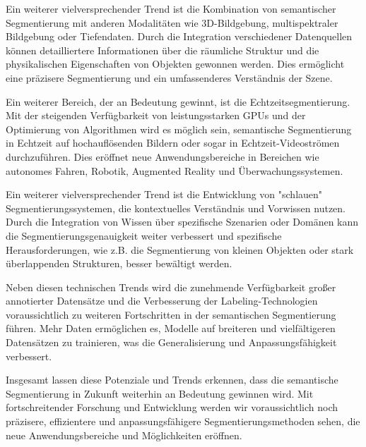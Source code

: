 Ein weiterer vielversprechender Trend ist die Kombination von semantischer
Segmentierung mit anderen Modalitäten wie 3D-Bildgebung, multispektraler
Bildgebung oder Tiefendaten. Durch die Integration verschiedener Datenquellen
können detailliertere Informationen über die räumliche Struktur und die
physikalischen Eigenschaften von Objekten gewonnen werden. Dies ermöglicht eine
präzisere Segmentierung und ein umfassenderes Verständnis der Szene.

Ein weiterer Bereich, der an Bedeutung gewinnt, ist die Echtzeitsegmentierung.
Mit der steigenden Verfügbarkeit von leistungsstarken GPUs und der Optimierung
von Algorithmen wird es möglich sein, semantische Segmentierung in Echtzeit auf
hochauflösenden Bildern oder sogar in Echtzeit-Videoströmen durchzuführen. Dies
eröffnet neue Anwendungsbereiche in Bereichen wie autonomes Fahren, Robotik,
Augmented Reality und Überwachungssystemen.

 Ein weiterer vielversprechender Trend ist die Entwicklung von "schlauen"
Segmentierungssystemen, die kontextuelles Verständnis und Vorwissen nutzen.
Durch die Integration von Wissen über spezifische Szenarien oder Domänen kann
die Segmentierungsgenauigkeit weiter verbessert und spezifische
Herausforderungen, wie z.B. die Segmentierung von kleinen Objekten oder stark
überlappenden Strukturen, besser bewältigt werden.

Neben diesen technischen Trends wird die zunehmende Verfügbarkeit großer
annotierter Datensätze und die Verbesserung der Labeling-Technologien
voraussichtlich zu weiteren Fortschritten in der semantischen Segmentierung
führen. Mehr Daten ermöglichen es, Modelle auf breiteren und vielfältigeren
Datensätzen zu trainieren, was die Generalisierung und Anpassungsfähigkeit
verbessert.

Insgesamt lassen diese Potenziale und Trends erkennen, dass die semantische
Segmentierung in Zukunft weiterhin an Bedeutung gewinnen wird. Mit
fortschreitender Forschung und Entwicklung werden wir voraussichtlich noch
präzisere, effizientere und anpassungsfähigere Segmentierungsmethoden sehen,
die neue Anwendungsbereiche und Möglichkeiten eröffnen.